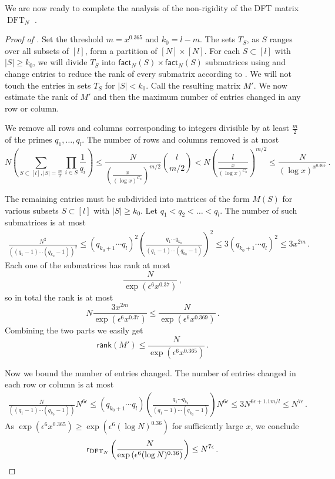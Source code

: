 \documentclass{toc}
\renewcommand\fact{\textsf{fact}}
\newcommand\rank{\textsf{rank}}
\DeclareMathOperator{\DFT}{DFT}
\begin{document}
We are now ready to complete the analysis of the non-rigidity of the %
DFT %
matrix %
$\DFT_N$ %
.
\begin{proof}[Proof of ]
Set the threshold $m = x^{0.365}$ and $k_0 = l -m$.  The sets $T_S$, as $S$ ranges over all subsets of $[l]$, form a partition of $[N] \times [N]$.  For each $S \subset [l]$ with $|S| \geq k_0$, we will divide $T_S$ into $\fact_N(S) \times \fact_N(S)$ submatrices using  and change entries to reduce the rank of every submatrix according to .  We will not touch the entries in sets $T_S$ for $|S| < k_0$.  Call the resulting matrix $M'$.  We now estimate the rank of $M'$ and then the maximum number of entries changed in any row or column.

We remove all rows and columns corresponding to integers divisible by at least $\frac{m}{2}$ of the primes $q_1, \dots , q_l$.  The number of rows and columns removed is at most
\[
N\left( \sum_{S \subset [l] , |S| = \frac{m}{2}} \prod_{i \in S} \frac{1}{q_i} \right) \leq \frac{N}{\left(\frac{x}{(\log x)^{C_0 }}\right)^{m/2}} \binom{l}{m/2} < N \left(\frac{l}{\frac{x}{(\log x)^{C_0 }}}\right)^{m/2}\leq \frac{N}{(\log x)^{x^{0.365}}} \,.
\]


The remaining entries must be subdivided into matrices of the form $M(S)$ for various subsets $S \subset [l]$ %
with %
%
 $|S| \geq k_0$.  
%
Let   %
 $q_1 < q_2 < \dots < q_l$.  The number of such submatrices is at most 
\[
\begin{multlined}
\frac{N^2}{\left( (q_1-1) \cdots (q_{k_0}-1) \right)^2} \leq (q_{k_0+1} \cdots q_l)^2 \left( \frac{q_1 \cdots q_{k_0}}{(q_1-1) \cdots (q_{k_0}-1)} \right)^2 \leq 3(q_{k_0+1} \cdots q_l)^2 \leq 3x^{2m} \,.
\end{multlined}
\]
Each one of the submatrices has rank at most 
\[
\frac{N}{\exp\left(\epsilon^6 x^{0.37}\right)} \,,
\]
so in total the rank is at most
\[
N\frac{3x^{2m}}{\exp\left(\epsilon^6 x^{0.37}\right)} \leq \frac{N}{\exp\left(\epsilon^6 x^{0.369}\right)} \,.
\]
Combining the two parts we easily get
\[
\rank(M') \leq \frac{N}{\exp\left(\epsilon^6 x^{0.365}\right)} \,.
\]

Now we bound the number of entries changed.  The number of entries changed in each row or column is at most
\[
\begin{multlined}
\frac{N}{\left( (q_1-1) \cdots (q_{k_0}-1) \right)}N^{ 6\epsilon} \leq  (q_{k_0+1} \cdots q_l) \left(\frac{q_1 \cdots q_{k_0}}{(q_1-1) \cdots (q_{k_0}-1)} \right) N^{ 6\epsilon} 
\leq 3N^{6\epsilon + 1.1 m/l} \leq N^{ 7 \epsilon} \,.
\end{multlined}
\]
As $\exp\left(\epsilon^6x^{0.365}\right) \geq \exp\left(\epsilon^6 (\log N)^{0.36}\right)$ for sufficiently large $x$, we conclude
%
%
%
\[
\textsf{r}_{\DFT_N}\left( \frac{N}{\exp\left(\epsilon^6 (\log N)^{0.36}\right)} \right) \leq N^{ 7 \epsilon} \,. \qedhere
\] %
\end{proof}
\end{document}
